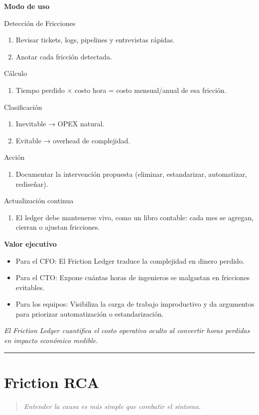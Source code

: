 \textbf{Modo de uso}

Detección de Fricciones
\begin{enumerate}
    \item Revisar tickets, logs, pipelines y entrevistas rápidas.
    \item Anotar cada fricción detectada.
\end{enumerate}

Cálculo
\begin{enumerate}
    \item Tiempo perdido × costo hora = costo mensual/anual de esa fricción.
\end{enumerate}

Clasificación
\begin{enumerate}
    \item Inevitable → OPEX natural.
    \item Evitable → overhead de complejidad.
\end{enumerate}

Acción
\begin{enumerate}
    \item Documentar la intervención propuesta (eliminar, estandarizar, automatizar, rediseñar).
\end{enumerate}

Actualización continua
\begin{enumerate}
    \item El ledger debe mantenerse vivo, como un libro contable: cada mes se agregan, cierran o ajustan fricciones.
\end{enumerate}

\textbf{Valor ejecutivo}
\begin{itemize}
    \item Para el CFO: El Friction Ledger traduce la complejidad en dinero perdido.
    \item Para el CTO: Expone cuántas horas de ingenieros se malgastan en fricciones evitables.
    \item Para los equipos: Visibiliza la carga de trabajo improductivo y da argumentos para priorizar automatización o estandarización.
\end{itemize}

{\epigraph{\textit{El Friction Ledger cuantifica el costo operativo oculto al convertir horas perdidas en impacto económico medible.}}{}}


\hrule
\section{Friction RCA}
\begin{quote}
\textit{Entender la causa es más simple que combatir el síntoma.}
\end{quote}

